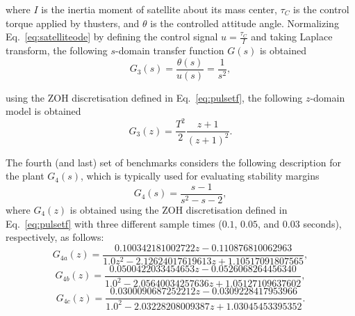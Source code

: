 \documentclass{sig-alternate-05-2015}
\begin{document}
\noindent where $I$ is the inertia moment of satellite about its mass
center, $\tau_{C}$ is the control torque applied by thusters, and $\theta$
is the controlled attitude angle.  Normalizing Eq.~\eqref{eq:satelliteode}
by defining the control signal $u=\frac{\tau_{C}}{I}$ and taking Laplace
transform, the following $s$-domain transfer function $G(s)$ is obtained
%
\begin{equation}
\label{eq:satellitetf}
G_{3}(s)=\frac{\theta(s)}{u(s)}=\frac{1}{s^2},
\end{equation}

\noindent using the ZOH discretisation defined in Eq.~\eqref{eq:pulsetf}, 
the following $z$-domain model is obtained
%
\begin{equation}
G_{3}(z)= \frac{T^{2}}{2} \frac{z+1}{(z+1)^{2}}. \nonumber
\end{equation}

%
%

The fourth (and last) set of benchmarks considers the following description
for the plant $G_{4}(s)$, which is typically used for evaluating stability
margins~\cite{bhattacharyya97, keel_Bhattacharyya_examples}
%
\begin{equation}
\label{exampleA}
G_{4}(s)=\frac{s-1}{s^{2}-s-2},
\end{equation}
%
\noindent where $G_{4}(z)$ is obtained using the ZOH discretisation defined
in Eq.~\eqref{eq:pulsetf} with three different sample times ($0.1$, $0.05$,
and $0.03$ seconds), respectively, as follows:
%
\begin{equation}
\label{exampleA-sampletime1}
G_{4a}(z)=\frac{0.100342181002722z - 0.110876810062963}{1.0z^{2} - 2.12624017619613z + 1.10517091807565}, \nonumber
\end{equation}
%
%
\begin{equation}
\label{exampleA-sampletime2}
G_{4b}(z)=\frac{0.0500422033454653z - 0.0526068264456340}{1.0^{2} - 2.05640034257636z + 1.05127109637602}, \nonumber
\end{equation}
%
%
\begin{equation}
\label{exampleA-sampletime3}
G_{4c}(z)=\frac{0.0300090687252212z - 0.0309228417953966}{1.0^{2} - 2.03228208009387z + 1.03045453395352}. \nonumber
\end{equation}
\end{document}
